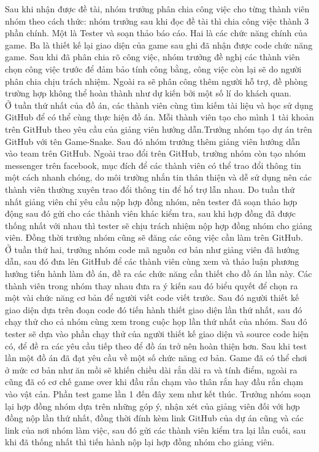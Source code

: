 \documentclass{article}
\begin{document}
Sau khi nhận được đề tài, nhóm trưởng phân chia công việc cho từng thành viên nhóm theo cách thức: nhóm trưởng sau khi đọc đề tài thì chia công việc thành 3 phần chính. Một là Tester và soạn thảo báo cáo. Hai là các chức năng chính của game. Ba là thiết kế lại giao diện của game sau ghi đã nhận được code chức năng game. Sau khi đã phân chia rõ công việc, nhóm trưởng đề nghị các thành viên chọn công việc trước để đảm bảo tính công bằng, công việc còn lại sẽ do người phân chia chịu trách nhiệm. Ngoài ra sẽ phân công thêm người hỗ trợ, đề phòng trường hợp không thể hoàn thành như dự kiến bởi một số lí do khách quan.\\
Ở tuần thứ nhất của đồ án, các thành viên cùng tìm kiếm tài liệu và học sử dụng GitHub để có thể cùng thực hiện đồ án. Mỗi thành viên tạo cho mình 1 tài khoản trên GitHub theo yêu cầu của giảng viên hướng dẫn.Trưởng nhóm tạo dự án trên GitHub với tên Game-Snake. Sau đó nhóm trưởng thêm giảng viên hướng dẫn vào team trên GitHub. Ngoài trao đổi trên GitHub, trường nhóm còn tạo nhóm messenger trên facebook, mục đích để các thành viên có thể trao đổi thông tin một cách nhanh chóng, do môi trường nhắn tin thân thiện và dễ sử dụng nên các thành viên thường xuyên trao đổi thông tin để hổ trợ lẫn nhau. Do tuần thứ nhất giảng viên chỉ yêu cầu nộp hợp đồng nhóm, nên tester đã soạn thảo hợp động sau đó gửi cho các thành viên khác kiểm tra, sau khi hợp đồng đã được thống nhất với nhau thì tester sẽ chịu trách nhiệm nộp hợp đồng nhóm cho giảng viên. Đồng thời trưởng nhóm cũng sẽ đăng các công việc cần làm trên GitHub.\\
Ở tuần thứ hai, trưởng nhóm code mã nguồn cơ bản như giảng viên đã hướng dẫn, sau đó đưa lên GitHub để các thành  viên cùng xem và thảo luận phương hướng tiến hành làm đồ án, đề ra các chức năng cần thiết cho đồ án lần này. Các thành viên trong nhóm thay nhau đưa ra ý kiến sau đó biểu quyết để chọn ra một vài chức năng cơ bản để người viết code viết trước. Sau đó người thiết kế giao diện dựa trên đoạn code đó tiến hành thiết giao diện lần thứ nhất, sau đó chạy thử cho cả nhóm cùng xem trong cuộc họp lần thứ nhất của nhóm. Sau đó tester sẽ dựa vào phần chạy thử của người thiết kế giao diện và source code hiện có, để đề ra các yêu cầu tiếp theo để đồ án trở nên hoàn thiện hơn. Sau khi test lần một đồ án đã đạt yêu cầu về một số chức năng cơ bản. Game đã có thể chơi ở mức cơ bản như ăn mồi sẽ khiến chiều dài rắn dài ra và tính điểm, ngoài ra cũng đã có cơ chế game over khi đầu rắn chạm vào thân rắn hay đầu rắn chạm vào vật cản. Phần test game lần 1 đến đây xem như kết thúc. Trưởng nhóm soạn lại hợp đồng nhóm dựa trên những góp ý, nhận xét của giảng viên đối với hợp đồng nộp lần thứ nhất, đồng thời đính kèm link GitHub của dự án cũng và các link của nơi nhóm làm việc, sau đó gửi các thành viên kiểm tra lại lần cuối, sau khi đã thống nhất thì tiến hành nộp lại hợp đồng nhóm cho giảng viên.\\
\end{document}
